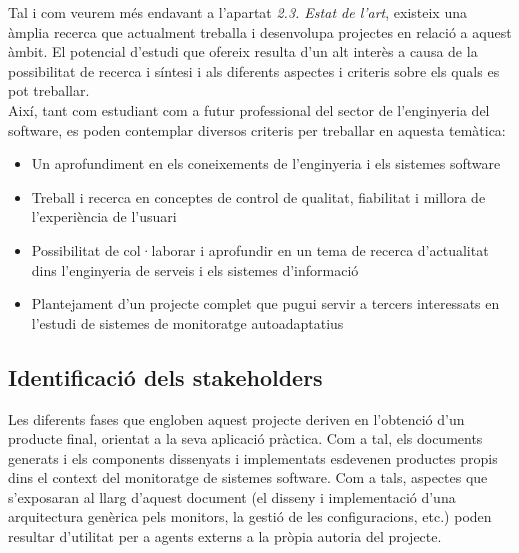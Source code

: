 Tal i com veurem més endavant a l’apartat \textit{2.3. Estat de l’art}, existeix una àmplia recerca que actualment treballa i desenvolupa projectes en relació a aquest àmbit. El potencial d’estudi que ofereix resulta d’un alt interès a causa de la possibilitat de recerca i síntesi i als diferents aspectes i criteris sobre els quals es pot treballar.\\

Així, tant com estudiant com a futur professional del sector de l’enginyeria del software, es poden contemplar diversos criteris per treballar en aquesta temàtica:
\begin{itemize}
\item Un aprofundiment en els coneixements de l’enginyeria i els sistemes software
\item Treball i recerca en conceptes de control de qualitat, fiabilitat i millora de l'experiència de l'usuari
\item Possibilitat de col·laborar i aprofundir en un tema de recerca d’actualitat dins l’enginyeria de serveis i els sistemes d’informació
\item Plantejament d’un projecte complet que pugui servir a tercers interessats en l’estudi de sistemes de monitoratge autoadaptatius
\end{itemize}  

\subsection{Identificació dels stakeholders}

Les diferents fases que engloben aquest projecte deriven en l'obtenció d'un producte final, orientat a la seva aplicació pràctica. Com a tal, els documents generats i els components dissenyats i implementats esdevenen productes propis dins el context del monitoratge de sistemes software. Com a tals, aspectes que s'exposaran al llarg d'aquest document (el disseny i implementació d'una arquitectura genèrica pels monitors, la gestió de les configuracions, etc.) poden resultar d'utilitat per a agents externs a la pròpia autoria del projecte.\\

